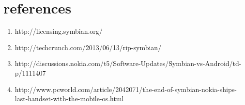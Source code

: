\documentclass[a4paper,11pt]{article}
\begin{document}
\section{references}
\begin{enumerate}
\item http://licensing.symbian.org/
\item http://techcrunch.com/2013/06/13/rip-symbian/
\item http://discussions.nokia.com/t5/Software-Updates/Symbian-vs-Android/td-p/1111407
\item http://www.pcworld.com/article/2042071/the-end-of-symbian-nokia-ships-last-handset-with-the-mobile-os.html

\end{enumerate}
\end{document}
